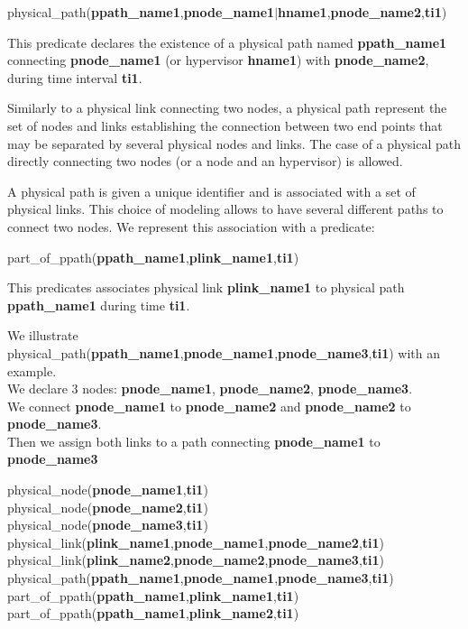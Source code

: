 \begin{myformula}
physical\_path(\textbf{ppath\_name1},\textbf{pnode\_name1}$\vert$\textbf{hname1},\textbf{pnode\_name2},\textbf{ti1})
\end{myformula}

This predicate declares the existence of a physical path named \textbf{ppath\_name1} connecting \textbf{pnode\_name1} (or hypervisor \textbf{hname1}) with \textbf{pnode\_name2}, during time interval \textbf{ti1}. 

Similarly to a physical link connecting two nodes, a physical path represent the set of nodes and links establishing the connection between two end points that may be separated by several physical nodes and links.
The case of a physical path directly connecting two nodes (or a node and an hypervisor) is allowed.

A physical path is given a unique identifier and is associated with a set of physical links. 
This choice of modeling allows to have several different paths to connect two nodes. 
We represent this association with a predicate:

\begin{myformula}
part\_of\_ppath(\textbf{ppath\_name1},\textbf{plink\_name1},\textbf{ti1})
\end{myformula}


This predicates associates physical link \textbf{plink\_name1} to physical path \textbf{ppath\_name1} during time \textbf{ti1}.

We illustrate physical\_path(\textbf{ppath\_name1},\textbf{pnode\_name1},\textbf{pnode\_name3},\textbf{ti1}) with an example.\\
We declare 3 nodes: \textbf{pnode\_name1}, \textbf{pnode\_name2}, \textbf{pnode\_name3}.\\
We connect \textbf{pnode\_name1} to \textbf{pnode\_name2} and \textbf{pnode\_name2} to \textbf{pnode\_name3}.\\
Then we assign both links to a path connecting \textbf{pnode\_name1} to \textbf{pnode\_name3}

\begin{myformula}
physical\_node(\textbf{pnode\_name1},\textbf{ti1})\\
physical\_node(\textbf{pnode\_name2},\textbf{ti1})\\
physical\_node(\textbf{pnode\_name3},\textbf{ti1})\\
physical\_link(\textbf{plink\_name1},\textbf{pnode\_name1},\textbf{pnode\_name2},\textbf{ti1})\\
physical\_link(\textbf{plink\_name2},\textbf{pnode\_name2},\textbf{pnode\_name3},\textbf{ti1})\\
physical\_path(\textbf{ppath\_name1},\textbf{pnode\_name1},\textbf{pnode\_name3},\textbf{ti1})\\
part\_of\_ppath(\textbf{ppath\_name1},\textbf{plink\_name1},\textbf{ti1})\\
part\_of\_ppath(\textbf{ppath\_name1},\textbf{plink\_name2},\textbf{ti1})
\end{myformula}

